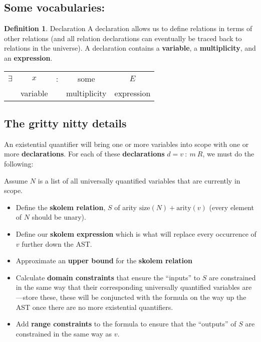 \documentclass{article}
\theoremstyle{definition}
\newtheorem{definition}{Definition}[subsection]
\begin{document}
    \subsection{Some vocabularies:}

    \theoremstyle{definition}
    \begin{definition}{Declaration}
        A declaration allows us to define relations in terms of other relations (and all relation declarations can eventually be traced back to relations in the universe). A declaration contains a \textbf{variable}, a \textbf{multiplicity}, and an \textbf{expression}.

        \begin{center}
            \begin{tabular}{c c c c c}
                $\exists$ & $x$ & : & some & $E$ \\
                & variable & & multiplicity & expression
                
            \end{tabular}
        \end{center}
    \end{definition}

    \subsection{The gritty nitty details}

    An existential quantifier will bring one or more variables into scope with one or more \textbf{declarations}. For each of these \textbf{declarations} $d = v~:~m~R$, we must do the following:

    Assume $N$ is a list of all universally quantified variables that are currently in scope.

    \begin{itemize}
        \item Define the \textbf{skolem relation}, $S$ of arity $\text{size}(N) + \text{arity}(v)$ (every element of $N$ should be unary).
        \item Define our \textbf{skolem expression} which is what will replace every occurrence of $v$ further down the AST.
        \item Approximate an \textbf{upper bound} for the \textbf{skolem relation}
        \item Calculate \textbf{domain constraints} that ensure the ``inputs'' to $S$ are constrained in the same way that their corresponding universally quantified variables are---store these, these will be conjuncted with the formula on the way up the AST once there are no more existential quantifiers.
        \item Add \textbf{range constraints} to the formula to ensure that the ``outputs'' of $S$ are constrained in the same way as $v$.
    \end{itemize}
\end{document}
